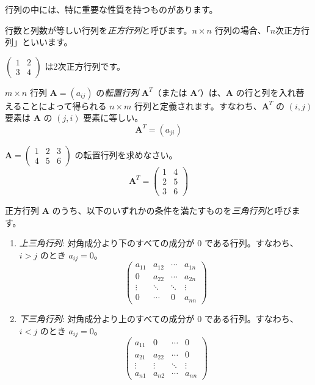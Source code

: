 行列の中には、特に重要な性質を持つものがあります。

\begin{dfn}[正方行列] \label{square_matrix}
行数と列数が等しい行列を\emph{正方行列}と呼びます。$n \times n$ 行列の場合、「$n$次正方行列」といいます。
\end{dfn}

\begin{ex}
$\begin{pmatrix} 1 & 2 \\ 3 & 4 \end{pmatrix}$ は2次正方行列です。
\end{ex}

\begin{dfn}[転置行列]
$m \times n$ 行列 $\bm{A} = (a_{ij})$ の\emph{転置行列} $\bm{A}^T$（または $\bm{A}'$）は、$\bm{A}$ の行と列を入れ替えることによって得られる $n \times m$ 行列と定義されます。すなわち、$\bm{A}^T$ の $(i,j)$ 要素は $\bm{A}$ の $(j,i)$ 要素に等しい。
\[ \bm{A}^T = (a_{ji}) \]
\end{dfn}

\begin{ex}
$\bm{A} = \begin{pmatrix} 1 & 2 & 3 \\ 4 & 5 & 6 \end{pmatrix}$ の転置行列を求めなさい。
\[ \bm{A}^T = \begin{pmatrix} 1 & 4 \\ 2 & 5 \\ 3 & 6 \end{pmatrix} \]
\end{ex}

\begin{dfn}[三角行列] \label{triangular_matrix}
正方行列 $\bm{A}$ のうち、以下のいずれかの条件を満たすものを\emph{三角行列}と呼びます。
\begin{enumerate}
\item \emph{上三角行列}: 対角成分より下のすべての成分が $0$ である行列。すなわち、$i > j$ のとき $a_{ij} = 0$。
\[ \begin{pmatrix} a_{11} & a_{12} & \cdots & a_{1n} \\ 0 & a_{22} & \cdots & a_{2n} \\ \vdots & \ddots & \ddots & \vdots \\ 0 & \cdots & 0 & a_{nn} \end{pmatrix} \]
\item \emph{下三角行列}: 対角成分より上のすべての成分が $0$ である行列。すなわち、$i < j$ のとき $a_{ij} = 0$。
\[ \begin{pmatrix} a_{11} & 0 & \cdots & 0 \\ a_{21} & a_{22} & \cdots & 0 \\ \vdots & \vdots & \ddots & \vdots \\ a_{n1} & a_{n2} & \cdots & a_{nn} \end{pmatrix} \]
\end{enumerate}
\end{dfn}

